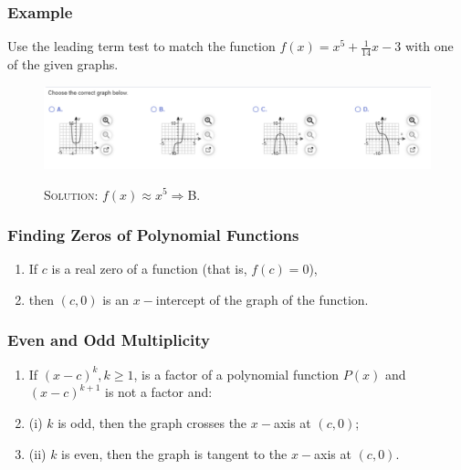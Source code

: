 \documentclass{beamer}
\begin{document}
\begin{frame}
	\frametitle{Example}
	\begin{enumerate}
		\item[]<1-> Use the leading term test to match the function $f(x)=x^{5}+\frac{1}{14}x-3$ with one of the given graphs.  
		\item[]<2->
    \begin{figure}
      \begin{center}
        \caption{}
        \includegraphics[scale=0.375]{4_1_7.png}
      \end{center}
      \item[]<3-> \textsc{Solution:} $f(x) \approx x^{5} \Rightarrow $B. 
    \end{figure}
	\end{enumerate}
\end{frame}

\begin{frame}
	\frametitle{Finding Zeros of Polynomial Functions}
	\begin{enumerate}
		\item[]<1->If $c$ is a real zero of a function (that is, $f(c)=0$), 
		\item[]<2->then $(c,0)$ is an $x-$intercept of the graph of the function.  
	\end{enumerate}
\end{frame}

\begin{frame}
	\frametitle{Even and Odd Multiplicity} 
	\begin{enumerate}
		\item[]<1->If $(x-c)^{k}, k \geq 1$, is a factor of a polynomial function $P(x)$ and $(x-c)^{k+1}$ is not a factor and: 
		\item[]<2-> (i) $k$ is odd, then the graph crosses the $x-$axis at $(c,0)$;  
		\item[]<3-> (ii) $k$ is even, then the graph is tangent to the $x-$axis at $(c,0)$.  
	\end{enumerate}
\end{frame}
\end{document}
